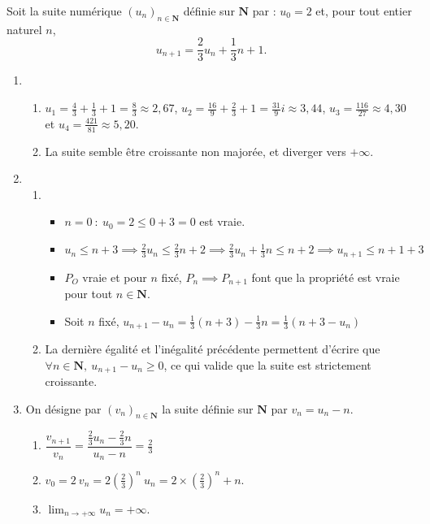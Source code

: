 \documentclass[a4paper,12pt,french]{article}
\newcommand{\N}{\mathbf{N}}
\renewcommand{\u}{(u_n)_{n\in\N}}
\begin{document}
\begin{Answer}[number=1]
  Soit la suite numérique $\u$ définie sur $\N$ par : $u_0 =2$ et, pour
  tout entier naturel $n$, \[ u_{n+1} = \frac23 u_n + \frac13 n +1. \]
  \begin{enumerate}
    \item \begin{enumerate}
        \item $u_1 = \frac43 + \frac13 + 1 = \frac83 \approx 2,67$, $u_2
          = \frac{16}9 + \frac23 + 1 = \frac{31}9i \approx 3,44$, $u_3 =
          \frac{116}{27} \approx 4,30$ et $u_4 = \frac{421}{81} \approx
          5,20$.
        \item La suite semble être croissante non majorée, et diverger
          vers $+\infty$.
      \end{enumerate}
    \item \begin{enumerate}
        \item \begin{itemize}
            \item $n=0\ :\ u_0 = 2 \leqslant 0 + 3 = 0$ est vraie.
            \item $u_n \leqslant n+3 \implies \frac23 u_n \leqslant
              \frac23 n + 2 \implies \frac23 u_n + \frac13 n \leqslant
              n + 2 \implies u_{n+1} \leqslant n + 1 + 3$
            \item $P_O$ vraie et pour $n$ fixé, $P_n \implies P_{n+1}$
              font que la propriété est vraie pour tout $n\in\N$.
            \item Soit $n$ fixé, $u_{n+1} - u_n = \frac13 (n + 3) -
              \frac13n = \frac13\left(n+3 - u_n\right)$
          \end{itemize}
        \item La dernière égalité et l'inégalité précédente permettent
          d'écrire que $\forall n\in\N,\ u_{n+1} - u_n \geqslant 0$, ce
          qui valide que la suite est strictement croissante.
      \end{enumerate}
    \item On désigne par $(v_n)_{n\in\N}$ la suite définie sur $\N$ par
      $v_n = u_n -n$.
      \begin{enumerate}
        \item $\dfrac{v_{n+1}}{v_n} = \dfrac{\frac23u_n - \frac23n}{u_n
          - n}=\frac23$
        \item $v_0 = 2 \ v_n =2\left(\frac23\right)^n \ u_n = 2\times
          \left(\frac23\right)^n + n$.
        \item $\lim_{n\to+\infty}u_n = +\infty$.
      \end{enumerate}
  \end{enumerate}
\end{Answer}
\end{document}
